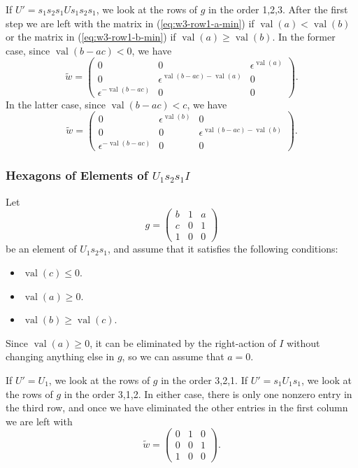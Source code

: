 \documentclass{amsart}
\theoremstyle{definition}
\def\e{\epsilon}
\def\w{\widetilde{w}}
\def\val{\mathop{\mathrm{val}}}
\begin{document}
  If $U' = s_1s_2s_1 U s_1s_2s_1$, we look at the rows of $g$ in the order
  1,2,3. After the first step we are left with the matrix in
  (\ref{eq:w3-row1-a-min}) if $\val(a) < \val(b)$ or the matrix in
  (\ref{eq:w3-row1-b-min}) if $\val(a) \ge \val(b)$.  In the former case, since
  $\val(b-ac) < 0$, we have
  \begin{equation*}
    \w =  \begin{pmatrix}
      0 & 0 & \e^{\val(a)} \\ 
      0 & \e^{\val(b-ac) - \val(a)} & 0 \\
      \e^{-\val(b-ac)} & 0 & 0 
      \end{pmatrix}.
  \end{equation*}
  In the latter case, since $\val(b-ac) < c$, we have
  \begin{equation*}
    \w =  \begin{pmatrix}
      0 & \e^{\val(b)} & 0\\ 
      0 & 0 & \e^{\val(b-ac) - \val(b)} \\
      \e^{-\val(b-ac)} & 0 & 0
      \end{pmatrix}.
  \end{equation*}  
  
  \subsubsection{Hexagons of Elements of $U_1 s_2 s_1 I$}
  \label{sec:hexagons-u-s2-s1}
  Let
  \begin{equation*}
    g =
    \begin{pmatrix}
      b & 1 & a \\
      c & 0 & 1 \\
      1 & 0 & 0
    \end{pmatrix}
  \end{equation*}
  be an element of $U_1 s_2 s_1$, and assume that it satisfies the following
  conditions:
  \begin{itemize}
    \item $\val(c) \le 0$.
    \item $\val(a) \ge 0$.
    \item $\val(b) \ge \val(c)$.
  \end{itemize}
  Since $\val(a) \ge 0$, it can be eliminated by the right-action of $I$
  without changing anything else in $g$, so we can assume that $a = 0$.

  If $U' = U_1$, we look at the rows of $g$ in the order 3,2,1.  If $U' = s_1
  U_1 s_1$, we look at the rows of $g$ in the order 3,1,2.  In either case,
  there is only one nonzero entry in the third row, and once we have eliminated
  the other entries in the first column we are left with
  \begin{equation*}
    \w = \begin{pmatrix}
      0 & 1 & 0 \\
      0 & 0 & 1 \\
      1 & 0 & 0
    \end{pmatrix}.
  \end{equation*}
\end{document}
